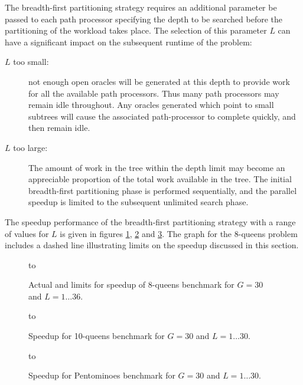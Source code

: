 The breadth-first partitioning strategy requires an additional parameter be passed to each
path processor specifying the depth to be searched before the partitioning of the workload 
takes place.  The selection of this parameter $L$ can have a significant impact on the
subsequent runtime of the problem:
\begin{description}
\item[$L$ too small:]{ not enough open oracles will be generated at this depth to provide work
  for all the available path processors.  Thus many path processors may remain idle throughout.
  Any oracles generated which point to small subtrees will cause the associated path-processor
  to complete quickly, and then remain idle.}
\item[$L$ too large:]{ The amount of work in the tree within the depth limit may become an
  appreciable proportion of the total work available in the tree.  The initial breadth-first
  partitioning phase is performed sequentially, and the parallel speedup is limited to the
  subsequent unlimited search phase.}
\end{description}

The speedup performance of the breadth-first partitioning strategy with a range of values for
$L$ is given in figures \ref{q8_cut_c_G_30_spdup}, \ref{q10_cut_c_G_30_spdup} and 
\ref{pent_cut_c_G_30_spdup}.  The graph for the 8-queens problem
includes a dashed line illustrating
limits on the speedup discussed in this section.

\begin{figure}[htbp]
\vspace{5mm} \hbox to 
\caption{Actual and limits for speedup of 8-queens benchmark for $G=30$ and $L=1\ldots 36$.}
\vspace{5mm}
\label{q8_cut_c_G_30_spdup}
\end{figure}

\begin{figure}[htbp]
\vspace{5mm} \hbox to 
\caption{Speedup for 10-queens benchmark for $G=30$ and $L=1\ldots 30$.}
\vspace{5mm}
\label{q10_cut_c_G_30_spdup}
\end{figure}

\begin{figure}[htbp]
\vspace{5mm} \hbox to 
\caption{Speedup for Pentominoes benchmark for $G=30$ and $L=1\ldots 30$.}
\vspace{5mm}
\label{pent_cut_c_G_30_spdup}
\end{figure}

